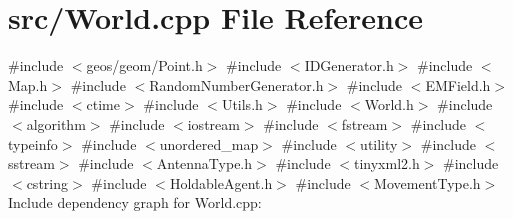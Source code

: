 \section{src/\+World.cpp File Reference}
\label{_world_8cpp}
{\ttfamily \#include $<$geos/geom/\+Point.\+h$>$}\newline
{\ttfamily \#include $<$I\+D\+Generator.\+h$>$}\newline
{\ttfamily \#include $<$Map.\+h$>$}\newline
{\ttfamily \#include $<$Random\+Number\+Generator.\+h$>$}\newline
{\ttfamily \#include $<$E\+M\+Field.\+h$>$}\newline
{\ttfamily \#include $<$ctime$>$}\newline
{\ttfamily \#include $<$Utils.\+h$>$}\newline
{\ttfamily \#include $<$World.\+h$>$}\newline
{\ttfamily \#include $<$algorithm$>$}\newline
{\ttfamily \#include $<$iostream$>$}\newline
{\ttfamily \#include $<$fstream$>$}\newline
{\ttfamily \#include $<$typeinfo$>$}\newline
{\ttfamily \#include $<$unordered\+\_\+map$>$}\newline
{\ttfamily \#include $<$utility$>$}\newline
{\ttfamily \#include $<$sstream$>$}\newline
{\ttfamily \#include $<$Antenna\+Type.\+h$>$}\newline
{\ttfamily \#include $<$tinyxml2.\+h$>$}\newline
{\ttfamily \#include $<$cstring$>$}\newline
{\ttfamily \#include $<$Holdable\+Agent.\+h$>$}\newline
{\ttfamily \#include $<$Movement\+Type.\+h$>$}\newline
Include dependency graph for World.\+cpp\+:
